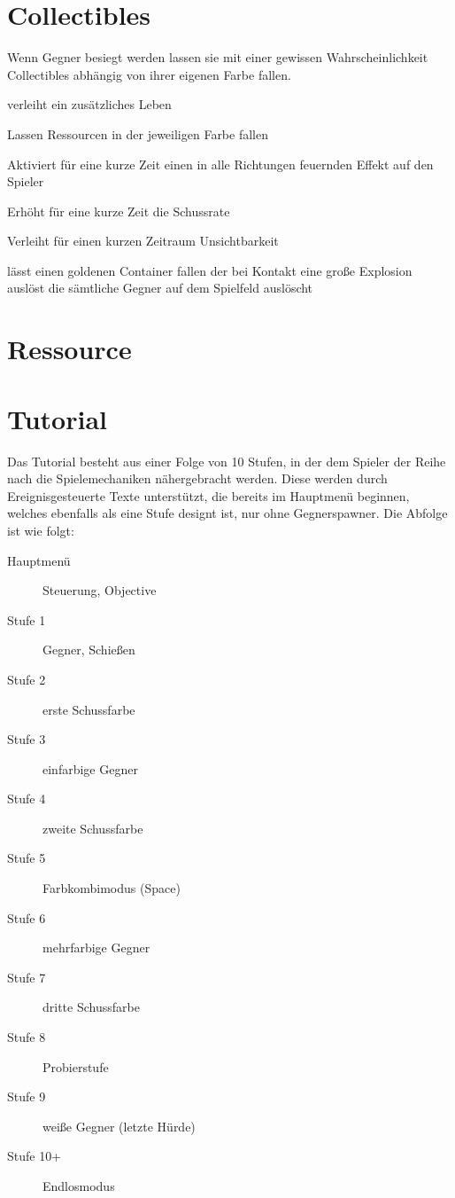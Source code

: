 \documentclass[a4paper,10pt,ngerman,fontsize=12pt]{scrreprt}
\begin{document}
\section{Collectibles}

Wenn Gegner besiegt werden lassen sie mit einer gewissen Wahrscheinlichkeit Collectibles abhängig von ihrer eigenen Farbe fallen.

\renewcommand{\itmspace}{5.5em}
{verleiht ein zusätzliches Leben}

{Lassen Ressourcen in der jeweiligen Farbe fallen}

{Aktiviert für eine kurze Zeit einen in alle Richtungen feuernden Effekt auf den Spieler}

{Erhöht für eine kurze Zeit die Schussrate}

{Verleiht für einen kurzen Zeitraum Unsichtbarkeit}

{lässt einen goldenen Container fallen der bei Kontakt eine große Explosion auslöst die sämtliche Gegner auf dem Spielfeld auslöscht}




\section{Ressource}




\section{Tutorial}

Das Tutorial besteht aus einer Folge von 10 Stufen, in der dem Spieler der Reihe nach die Spielemechaniken nähergebracht werden. Diese werden durch Ereignisgesteuerte Texte unterstützt, die bereits im Hauptmenü beginnen, welches ebenfalls als eine Stufe designt ist, nur ohne Gegnerspawner. Die Abfolge ist wie folgt:

\begin{description}
\item[Hauptmenü] Steuerung, Objective
\item[Stufe 1] Gegner, Schießen
\item[Stufe 2] erste Schussfarbe
\item[Stufe 3] einfarbige Gegner
\item[Stufe 4] zweite Schussfarbe
\item[Stufe 5] Farbkombimodus (Space)
\item[Stufe 6] mehrfarbige Gegner
\item[Stufe 7] dritte Schussfarbe
\item[Stufe 8] Probierstufe
\item[Stufe 9] weiße Gegner (letzte Hürde)
\item[Stufe 10+] Endlosmodus
\end{description}
\end{document}

